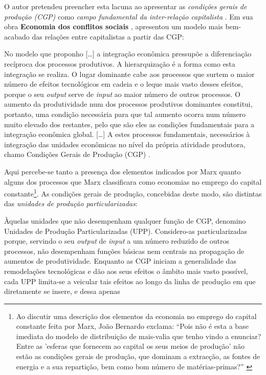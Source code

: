O autor pretendeu preencher esta lacuna ao apresentar as \textit{condições gerais de produção (CGP)} como \textit{campo fundamental da inter-relação capitalista} \cite[p.~110-115]{BERNARDO1977b}. Em sua obra \textbf{Economia dos conflitos sociais} \cite{BERNARDO1991}, apresentou um modelo mais bem-acabado das relações entre capitalistas a partir das CGP:

\begin{citacao}
No modelo que proponho [\dots] a integração econômica pressupõe a diferenciação recíproca dos processos produtivos. A hierarquização é a forma como esta integração se realiza. O lugar dominante cabe aos processos que surtem o maior número de efeitos tecnológicos em cadeia e o leque mais vasto desses efeitos, porque o seu \textit{output} serve de \textit{input} ao maior número de outros processos. O aumento da produtividade num dos processos produtivos dominantes constitui, portanto, uma condição necessária para que tal aumento ocorra num número muito elevado dos restantes, pelo que são eles as condições fundamentais para a integração econômica global. [\dots] A estes processos fundamentais, necessários à integração das unidades econômicas no nível da própria atividade produtora, chamo Condições Gerais de Produção (CGP) \cite[p.~157-158]{BERNARDO1991}.
\end{citacao}

Aqui percebe-se tanto a presença dos elementos indicados por Marx quanto alguns dos processos que Marx classificara como economias no emprego do capital constante\footnote{Ao discutir uma descrição dos elementos da economia no emprego do capital constante feita por Marx, João Bernardo exclama: ``Pois não é esta a base imediata do modelo de distribuição de mais-valia que tenho vindo a enunciar? Entre as 'esferas que fornecem ao capital os seus meios de produção' não estão as condições gerais de produção, que dominam a extracção, as fontes de energia e a sua repartição, bem como bom número de matérias-primas?'' \cite[p.~114]{BERNARDO1977b}}. As condições gerais de produção, concebidas deste modo, são distintas das \textit{unidades de produção particularizadas}:

\begin{citacao}
Àquelas unidades que não desempenham qualquer função de CGP, denomino Unidades de Produção Particularizadas (UPP). Considero-as particularizadas porque, servindo o seu \textit{output} de \textit{input} a um número reduzido de outros processos, não desempenham funções básicas nem centrais na propagação de aumentos de produtividade. Enquanto as CGP iniciam a generalidade das remodelações tecnológicas e dão aos seus efeitos o âmbito mais vasto possível, cada UPP limita-se a veicular tais efeitos ao longo da linha de produção em que diretamente se insere, e dessa apenas \cite[p.~158]{BERNARDO1991} 
\end{citacao}

